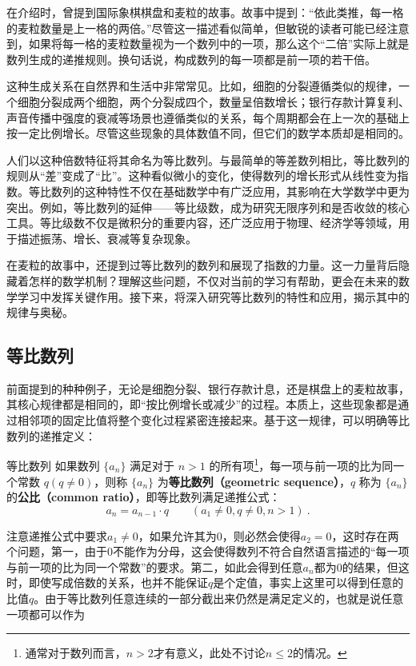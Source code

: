 
\begin{issues}
\issueDraft
\end{issues}


在介绍时，曾提到国际象棋棋盘和麦粒的故事。故事中提到：“依此类推，每一格的麦粒数量是上一格的两倍。”尽管这一描述看似简单，但敏锐的读者可能已经注意到，如果将每一格的麦粒数量视为一个数列中的一项，那么这个“二倍”实际上就是数列生成的递推规则。换句话说，构成数列的每一项都是前一项的若干倍。

这种生成关系在自然界和生活中非常常见。比如，细胞的分裂遵循类似的规律，一个细胞分裂成两个细胞，两个分裂成四个，数量呈倍数增长；银行存款计算复利、声音传播中强度的衰减等场景也遵循类似的关系，每个周期都会在上一次的基础上按一定比例增长。尽管这些现象的具体数值不同，但它们的数学本质却是相同的。

人们以这种倍数特征将其命名为等比数列。与最简单的等差数列相比，等比数列的规则从“差”变成了“比”。这种看似微小的变化，使得数列的增长形式从线性变为指数。等比数列的这种特性不仅在基础数学中有广泛应用，其影响在大学数学中更为突出。例如，等比数列的延伸——等比级数，成为研究无限序列和是否收敛的核心工具。等比级数不仅是微积分的重要内容，还广泛应用于物理、经济学等领域，用于描述振荡、增长、衰减等复杂现象。

在麦粒的故事中，还提到过等比数列的数列和展现了指数的力量。这一力量背后隐藏着怎样的数学机制？理解这些问题，不仅对当前的学习有帮助，更会在未来的数学学习中发挥关键作用。接下来，将深入研究等比数列的特性和应用，揭示其中的规律与奥秘。

\subsection{等比数列}

前面提到的种种例子，无论是细胞分裂、银行存款计息，还是棋盘上的麦粒故事，其核心规律都是相同的，即“按比例增长或减少”的过程。本质上，这些现象都是通过相邻项的固定比值将整个变化过程紧密连接起来。基于这一规律，可以明确等比数列的递推定义：

\begin{definition}{等比数列}
如果数列 $\{a_n\}$ 满足对于 $n > 1$ 的所有项\footnote{通常对于数列而言，$n>2$才有意义，此处不讨论$n\leq2$的情况。}，每一项与前一项的比为同一个常数 $q(q\neq0)$，则称 $\{a_n\}$ 为\textbf{等比数列（geometric sequence）}，$q$ 称为 $\{a_n\}$ 的\textbf{公比（common ratio）}，即等比数列满足递推公式：
\begin{equation}
a_{n}=a_{n-1}\cdot q\qquad( a_1\neq0,q\neq0,n>1)~.
\end{equation}
\end{definition}
注意递推公式中要求$a_1\neq0$，如果允许其为0，则必然会使得$a_2=0$，这时存在两个问题，第一，由于$0$不能作为分母，这会使得数列不符合自然语言描述的“每一项与前一项的比为同一个常数”的要求。第二，如此会得到任意$a_n$都为$0$的结果，但这时，即使写成倍数的关系，也并不能保证$q$是个定值，事实上这里可以得到任意的比值$q$。由于等比数列任意连续的一部分截出来仍然是满足定义的，也就是说任意一项都可以作为


